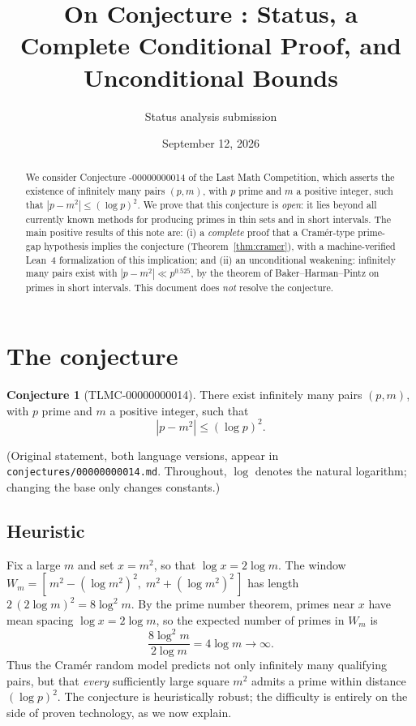 \documentclass[11pt]{article}
\title{On Conjecture \TLMC-00000000014: Status, a Complete Conditional Proof, and Unconditional Bounds}
\author{Status analysis submission}
\date{September 12, 2026}
\theoremstyle{definition}
\newtheorem{conjecture}[theorem]{Conjecture}
\theoremstyle{remark}
\newcommand{\TLMC}{\mathrm{TLMC}}
\begin{document}
\maketitle

\begin{abstract}
We consider Conjecture \TLMC-00000000014 of the Last Math Competition, which asserts the existence of infinitely many pairs $(p,m)$, with $p$ prime and $m$ a positive integer, such that $|p - m^2| \le (\log p)^2$. We prove that this conjecture is \emph{open}: it lies beyond all currently known methods for producing primes in thin sets and in short intervals. The main positive results of this note are: (i) a \emph{complete} proof that a Cram\'er-type prime-gap hypothesis implies the conjecture (Theorem~\ref{thm:cramer}), with a machine-verified Lean~4 formalization of this implication; and (ii) an unconditional weakening: infinitely many pairs exist with $|p-m^2| \ll p^{0.525}$, by the theorem of Baker--Harman--Pintz on primes in short intervals. This document does \emph{not} resolve the conjecture.
\end{abstract}

\section{The conjecture}

\begin{conjecture}[TLMC-00000000014]\label{conj:main}
There exist infinitely many pairs $(p, m)$, with $p$ prime and $m$ a positive integer, such that
\[
|p - m^2| \le (\log p)^2 .
\]
\end{conjecture}

(Original statement, both language versions, appear in \texttt{conjectures/00000000014.md}. Throughout, $\log$ denotes the natural logarithm; changing the base only changes constants.)

\subsection{Heuristic}

Fix a large $m$ and set $x = m^2$, so that $\log x = 2\log m$. The window
$W_m = [\,m^2 - (\log m^2)^2,\; m^2 + (\log m^2)^2\,]$ has length $2\,(2\log m)^2 = 8\log^2 m$.
By the prime number theorem, primes near $x$ have mean spacing $\log x = 2 \log m$, so the expected number of primes in $W_m$ is
\[
\frac{8 \log^2 m}{2\log m} = 4 \log m \longrightarrow \infty .
\]
Thus the Cram\'er random model predicts not only infinitely many qualifying pairs, but that \emph{every} sufficiently large square $m^2$ admits a prime within distance $(\log p)^2$. The conjecture is heuristically robust; the difficulty is entirely on the side of proven technology, as we now explain.
\end{document}
